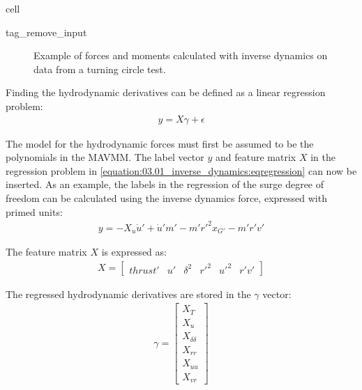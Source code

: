 \documentclass[review]{elsarticle}
\begin{document}
 \begin{sphinxuseclass}{cell}
 \begin{sphinxuseclass}{tag_remove_input}
 \end{sphinxuseclass}
 \end{sphinxuseclass}
 \begin{figure}[H]
 \centering
 \capstart

 \noindent{}
 \caption{Example of forces and moments calculated with inverse dynamics on data from a turning circle test.}\label{\detokenize{03.01_inverse_dynamics:fig-inverse}}\end{figure}

  
Finding the hydrodynamic derivatives can be defined as a linear regression problem:
\begin{equation}\label{equation:03.01_inverse_dynamics:eqregression}
\begin{split}y = X\gamma + \epsilon\end{split}
\end{equation}
  
The model for the hydrodynamic forces must first be assumed to be the polynomials in the MAVMM.
The label vector \(y\) and feature matrix \(X\) in the regression problem in \autoref{equation:03.01_inverse_dynamics:eqregression} can now be inserted. As an example, the labels in the regression of the surge degree of freedom can be calculated using the inverse dynamics force, expressed with primed units:
\begin{equation}\label{equation:03.01_inverse_dynamics:diff_eq_X_y}
\begin{split}\displaystyle y = - X_{\dot{u}} \dot{u}' + \dot{u}' m' - m' r'^{2} x_{G'} - m' r' v'\end{split}
\end{equation}
  
The feature matrix \(X\) is expressed as:
\begin{equation}\label{equation:03.01_inverse_dynamics:diff_eq_X_X}
\begin{split}\displaystyle X = \left[\begin{matrix}thrust' & u' & \delta^{2} & r'^{2} & u'^{2} & r' v'\end{matrix}\right]\end{split}
\end{equation}
  
The regressed hydrodynamic derivatives are stored in the \(\gamma\) vector:
\begin{equation}\label{equation:03.01_inverse_dynamics:diff_eq_X_beta}
\begin{split}\displaystyle \gamma = \left[\begin{matrix}X_{T}\\X_{u}\\X_{\delta\delta}\\X_{rr}\\X_{uu}\\X_{vr}\end{matrix}\right]\end{split}
\end{equation}
  
\end{document}
